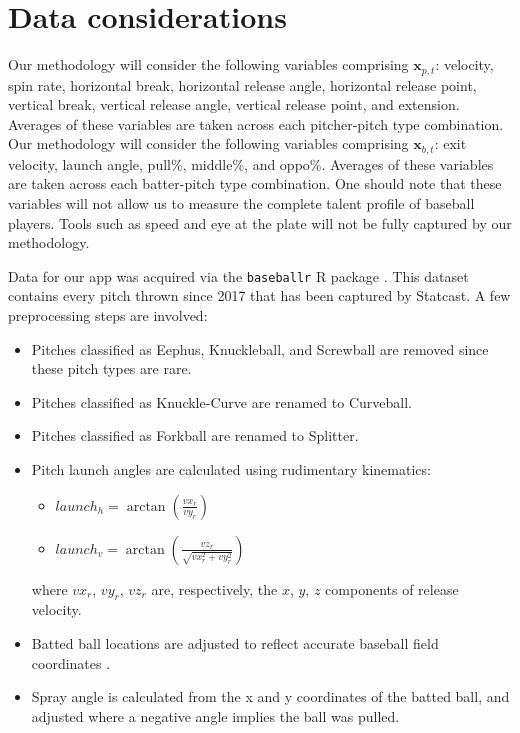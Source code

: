 \documentclass[12pt]{article}
\newcommand{\x}{\textbf{x}}
\begin{document}
\section{Data considerations}

Our methodology will consider the following variables comprising $\x_{p,t}$: velocity, spin rate, horizontal break, horizontal release angle, horizontal release point, vertical break, vertical release angle, vertical release point, and extension. Averages of these variables are taken across each pitcher-pitch type combination. Our methodology will consider the following variables comprising $\x_{b,t}$: exit velocity, launch angle, pull\%, middle\%, and oppo\%. Averages of these variables are taken across each batter-pitch type combination. One should note that these variables will not allow us to measure the complete talent profile of baseball players. %
Tools such as speed and eye at the plate will not be fully captured by our methodology.

Data for our app was acquired via the \texttt{baseballr} R package \citep{baseballr}. This dataset contains every pitch thrown since 2017 that has been captured by Statcast. A few preprocessing steps are involved:
\begin{itemize}
    \item Pitches classified as Eephus, Knuckleball, and Screwball are removed since these pitch types are rare.
    \item Pitches classified as Knuckle-Curve are renamed to Curveball.
    \item Pitches classified as Forkball are renamed to Splitter.
    \item Pitch launch angles are calculated using rudimentary kinematics:
        \begin{itemize}
            \item $launch_h = \arctan(\frac{vx_r}{vy_r})$
            \item $launch_v = \arctan\left(\frac{vz_r}{\sqrt{vx_r^2 + vy_r^2}}\right)$
        \end{itemize}
        where $vx_r$, $vy_r$, $vz_r$ are, respectively, the $x$, $y$, $z$ components of release velocity.
    \item Batted ball locations are adjusted to reflect accurate baseball field coordinates \citep{petti2017research}.
    \item Spray angle is calculated from the x and y coordinates of the batted ball, and adjusted where a negative angle implies the ball was pulled.
\end{itemize}
\end{document}
